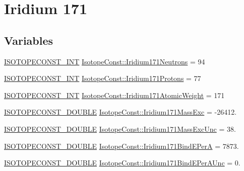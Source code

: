 \hypertarget{group___isotope_const-_iridium-_ir171}{}\section{Iridium 171}
\label{group___isotope_const-_iridium-_ir171}
\subsection*{Variables}
\begin{DoxyCompactItemize}
\item 
\mbox{\hyperlink{group___isotope_const-_macros_ga5f18360b3e99483a35c32d789e62621c}{I\+S\+O\+T\+O\+P\+E\+C\+O\+N\+S\+T\+\_\+\+I\+NT}} \mbox{\hyperlink{group___isotope_const-_iridium-_ir171_ga8e6a4359094a00c519c841e527fa8cfc}{Isotope\+Const\+::\+Iridium171\+Neutrons}} = 94
\item 
\mbox{\hyperlink{group___isotope_const-_macros_ga5f18360b3e99483a35c32d789e62621c}{I\+S\+O\+T\+O\+P\+E\+C\+O\+N\+S\+T\+\_\+\+I\+NT}} \mbox{\hyperlink{group___isotope_const-_iridium-_ir171_ga53ceca111aff99825272393759d71f86}{Isotope\+Const\+::\+Iridium171\+Protons}} = 77
\item 
\mbox{\hyperlink{group___isotope_const-_macros_ga5f18360b3e99483a35c32d789e62621c}{I\+S\+O\+T\+O\+P\+E\+C\+O\+N\+S\+T\+\_\+\+I\+NT}} \mbox{\hyperlink{group___isotope_const-_iridium-_ir171_gaa1991b477a3074b29627bb61deb34e66}{Isotope\+Const\+::\+Iridium171\+Atomic\+Weight}} = 171
\item 
\mbox{\hyperlink{group___isotope_const-_macros_ga8f45a7272ce02c0b4c65c44636ed719a}{I\+S\+O\+T\+O\+P\+E\+C\+O\+N\+S\+T\+\_\+\+D\+O\+U\+B\+LE}} \mbox{\hyperlink{group___isotope_const-_iridium-_ir171_gae92d8dc0302f6e004f631242b3328bfb}{Isotope\+Const\+::\+Iridium171\+Mass\+Exc}} = -\/26412.
\item 
\mbox{\hyperlink{group___isotope_const-_macros_ga8f45a7272ce02c0b4c65c44636ed719a}{I\+S\+O\+T\+O\+P\+E\+C\+O\+N\+S\+T\+\_\+\+D\+O\+U\+B\+LE}} \mbox{\hyperlink{group___isotope_const-_iridium-_ir171_ga61f6e1a6bbd3176316b623184312b566}{Isotope\+Const\+::\+Iridium171\+Mass\+Exc\+Unc}} = 38.
\item 
\mbox{\hyperlink{group___isotope_const-_macros_ga8f45a7272ce02c0b4c65c44636ed719a}{I\+S\+O\+T\+O\+P\+E\+C\+O\+N\+S\+T\+\_\+\+D\+O\+U\+B\+LE}} \mbox{\hyperlink{group___isotope_const-_iridium-_ir171_ga43c747b02c15cb12f91c9d2bd4d75d94}{Isotope\+Const\+::\+Iridium171\+Bind\+E\+PerA}} = 7873.
\item 
\mbox{\hyperlink{group___isotope_const-_macros_ga8f45a7272ce02c0b4c65c44636ed719a}{I\+S\+O\+T\+O\+P\+E\+C\+O\+N\+S\+T\+\_\+\+D\+O\+U\+B\+LE}} \mbox{\hyperlink{group___isotope_const-_iridium-_ir171_gaa07912282a180f7ddc2065e4e4d91cce}{Isotope\+Const\+::\+Iridium171\+Bind\+E\+Per\+A\+Unc}} = 0.

\end{DoxyCompactItemize}
